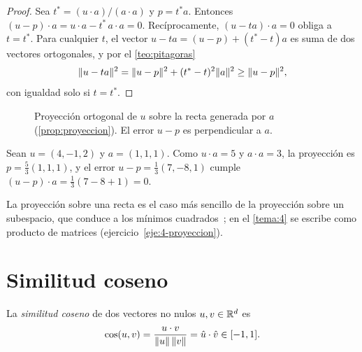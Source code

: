\begin{proof}
Sea $t^{*}=(u\cdot a)/(a\cdot a)$ y $p=t^{*}a$. Entonces $(u-p)\cdot a=u\cdot a-t^{*}\,a\cdot a=0$. Recíprocamente, $(u-ta)\cdot a=0$ obliga a $t=t^{*}$. Para cualquier $t$, el vector $u-ta=(u-p)+(t^{*}-t)a$ es suma de dos vectores ortogonales, y por el \cref{teo:pitagoras}
\[
\lVert u-ta\rVert^{2}=\lVert u-p\rVert^{2}+(t^{*}-t)^{2}\lVert a\rVert^{2}\ge\lVert u-p\rVert^{2},
\]
con igualdad solo si $t=t^{*}$.
\end{proof}

\begin{figure}[h]
\centering
{}
\caption{Proyección ortogonal de $u$ sobre la recta generada por $a$ (\cref{prop:proyeccion}). El error $u-p$ es perpendicular a $a$.}
\label{fig:proyeccion}
\end{figure}

\begin{ejemplo}\label{ej:proyeccion}
Sean $u=(4,-1,2)$ y $a=(1,1,1)$. Como $u\cdot a=5$ y $a\cdot a=3$, la proyección es $p=\tfrac53(1,1,1)$, y el error $u-p=\tfrac13(7,-8,1)$ cumple $(u-p)\cdot a=\tfrac13(7-8+1)=0$.
\end{ejemplo}

La proyección sobre una recta es el caso más sencillo de la proyección sobre un subespacio, que conduce a los mínimos cuadrados~\cite[§4.2]{strang}; en el \cref{tema:4} se escribe como producto de matrices (ejercicio~\ref{eje:4-proyeccion}).

\section{Similitud coseno}

\begin{definicion}\label{def:coseno}
La \emph{similitud coseno} de dos vectores no nulos $u,v\in\mathbb{R}^{d}$ es
\[
\cos(u,v)=\frac{u\cdot v}{\lVert u\rVert\,\lVert v\rVert}=\hat u\cdot\hat v\in[-1,1].
\]
\end{definicion}

